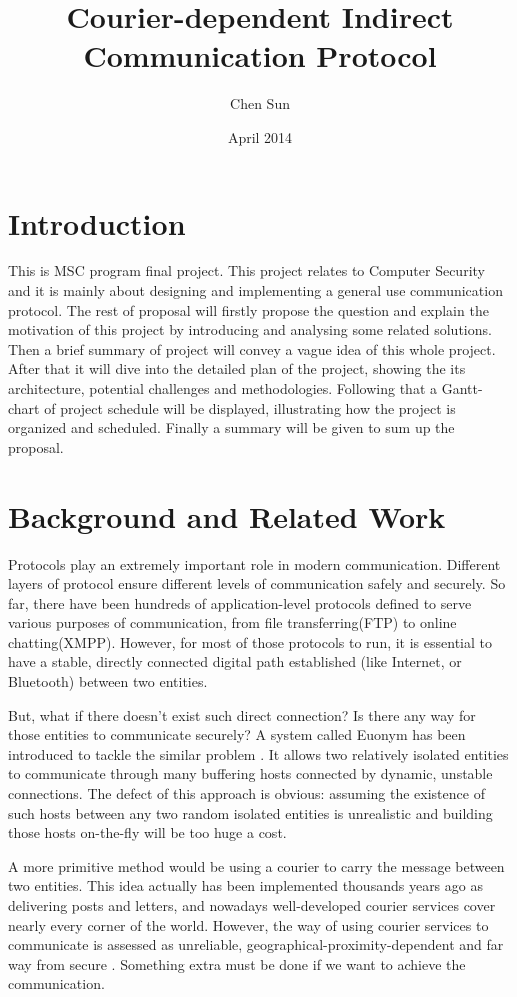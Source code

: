 \documentclass[11pt,a4paper]{article}
\begin{document}
\title{Courier-dependent Indirect Communication Protocol}
\author{Chen Sun}
\date{April 2014}
\maketitle

\section{Introduction}
This is MSC program final project. This project relates to Computer Security and it is mainly about designing and implementing a general use communication protocol. The rest of proposal will firstly propose the question and explain the motivation of this project by introducing and analysing some related solutions. Then a brief summary of project will convey a vague idea of this whole project. After that it will dive into the detailed plan of the project, showing the its architecture, potential challenges and methodologies. Following that a Gantt-chart of project schedule will be displayed, illustrating how the project is organized and scheduled. Finally a summary will be given to sum up the proposal.

\section{Background and Related Work}
Protocols play an extremely important role in modern communication. Different layers of protocol ensure different levels of communication safely and securely. So far, there have been hundreds of application-level protocols defined to serve various purposes of communication, from file transferring(FTP) to online chatting(XMPP). However, for most of those protocols to run, it is essential to have a stable, directly connected digital path established (like Internet, or Bluetooth) between two entities.\par
But, what if there doesn't exist such direct connection? Is there any way for those entities to communicate securely? A system called Euonym has been introduced to tackle the similar problem \cite{gregory}. It allows two relatively isolated entities to communicate through many buffering hosts connected by dynamic, unstable connections. The defect of this approach is obvious: assuming the existence of such hosts between any two random isolated entities is unrealistic and building those hosts on-the-fly will be too huge a cost.\par
A more primitive method would be using a courier to carry the message between two entities. This idea actually has been implemented thousands years ago as delivering posts and letters, and nowadays well-developed courier services cover nearly every corner of the world. However, the way of using courier services to communicate is assessed as unreliable, geographical-proximity-dependent and far way from secure \cite{horgan}. Something extra must be done if we want to achieve the communication.\par
\end{document}
